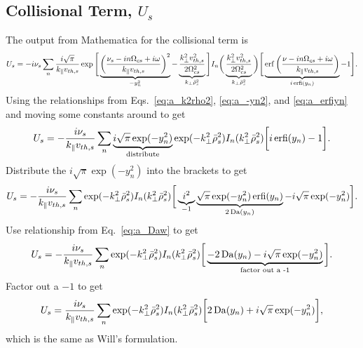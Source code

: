 \subsection{Collisional Term, $U_s$}
The output from Mathematica for the collisional term is
\begin{equation}
	U_s = -i \nu_s \sum_n \frac{i \sqrt{\pi}}{k_\parallel v_{th,s}} 
	\exp \Bigg[ \underbrace{\bigg( \frac{\nu_s - i n \Omega_{cs} + i \omega}{k_\parallel v_{th,s}}\bigg)^2}_{-y_n^2} 
	- \underbrace{\frac{k_\perp^2 v_{th,s}^2}{2 \Omega_{cs}^2}}_{k_\perp \bar{\rho}_s^2}  	\Bigg]
	I_n \bigg( \underbrace{\frac{k_\perp^2 v_{th,s}^2}{2 \Omega_{cs}^2}}_{k_\perp \bar{\rho}_s^2} \bigg)
	\Bigg[ \underbrace{\operatorname{erf} \bigg( \frac{\nu- i n \Omega_{cs} + i \omega}{k_\parallel v_{th,s}} \bigg)}_{i \operatorname{erfi}(y_n)}
	 - 1 \Bigg].
\end{equation}
Using the relationships from Eqs.~\ref{eq:a_k2rho2}, \ref{eq:a_-yn2}, and \ref{eq:a_erfiyn} and moving some constants around to get
\begin{equation}
	U_s = - \frac{i \nu_s }{k_\parallel v_{th,s}} \sum_n
	\underbrace{i \sqrt{\pi} \exp( -y_n^2 )}_{\text{distribute}}
	\exp(-k_\perp^2 \bar{\rho}_s^2) 
	I_n(k_\perp^2 \bar{\rho}_s^2) 
	\bigg[ i \operatorname{erfi}(y_n) - 1 \bigg].
\end{equation}
Distribute the $i\sqrt{\pi} \exp(-y_n^2)$ into the brackets to get
\begin{equation}
	U_s = - \frac{i \nu_s }{k_\parallel v_{th,s}} \sum_n
	\exp(-k_\perp^2 \bar{\rho}_s^2) 
	I_n(k_\perp^2 \bar{\rho}_s^2) 
	\bigg[ \underbrace{i^2}_{-1}
	\underbrace{\sqrt{\pi} \exp(-y_n^2) \operatorname{erfi}(y_n)}_{2 \operatorname{Da}(y_n)}
	- i \sqrt{\pi} \exp(-y_n^2)
	\bigg].
\end{equation}
Use relationship from Eq.~\ref{eq:a_Daw} to get
\begin{equation}
	U_s = - \frac{i \nu_s }{k_\parallel v_{th,s}} \sum_n
	\exp(-k_\perp^2 \bar{\rho}_s^2) 
	I_n(k_\perp^2 \bar{\rho}_s^2) 
	\bigg[ \underbrace{- 2 \operatorname{Da}(y_n)
	- i \sqrt{\pi} \exp(-y_n^2)}_{\text{factor out a -1}} \bigg].
\end{equation}
Factor out a $-1$ to get
\begin{equation}
	U_s = \frac{i \nu_s }{k_\parallel v_{th,s}} \sum_n
	\exp(-k_\perp^2 \bar{\rho}_s^2) 
	I_n(k_\perp^2 \bar{\rho}_s^2) 
	\bigg[  2 \operatorname{Da}(y_n)
		+ i \sqrt{\pi} \exp(-y_n^2) \bigg],
\end{equation}
which is the same as Will's formulation.
%
%
